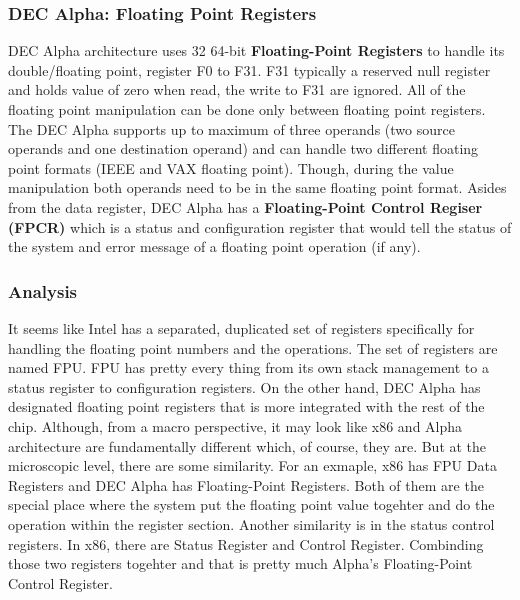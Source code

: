 \documentclass[letterpaper,10pt,titlepage]{article}
\begin{document}

\subsubsection{DEC Alpha: Floating Point Registers}
DEC Alpha architecture uses 32 64-bit \textbf{Floating-Point Registers} to handle its 
double/floating point, register F0 to F31. F31 typically a reserved null register
and holds value of zero when read, the write to F31 are ignored. All 
of the floating point manipulation can be done only between floating point 
registers. The DEC Alpha supports up to maximum of three operands
(two source operands and one destination operand) and can handle 
two different floating point formats (IEEE and VAX floating point). 
Though, during the value manipulation both operands need to be in the same
floating point format. Asides from the data register, DEC Alpha has a \textbf{Floating-Point 
Control Regiser (FPCR)} which is a status and configuration register that would
tell the status of the system and error message of a floating point operation (if any).
\par
\subsubsection{Analysis}
It seems like Intel has a separated, duplicated set of registers specifically 
for handling the floating point numbers and the operations. The set of 
registers are named FPU. FPU has pretty every thing from its own stack 
management to a status register to configuration registers. On the other hand,
DEC Alpha has designated floating point registers that is more integrated with 
the rest of the chip. Although, from a macro perspective, it may look like 
x86 and Alpha architecture are fundamentally different which, of course, they are.
But at the microscopic level, there are some similarity. For an exmaple, 
x86 has FPU Data Registers and DEC Alpha has Floating-Point Registers. Both
of them are the special place where the system put the floating point value 
togehter and do the operation within the register section. Another similarity 
is in the status control registers. In x86, there are Status Register and 
Control Register. Combinding those two registers togehter and that is pretty much
Alpha's Floating-Point Control Register.



\end{document}

